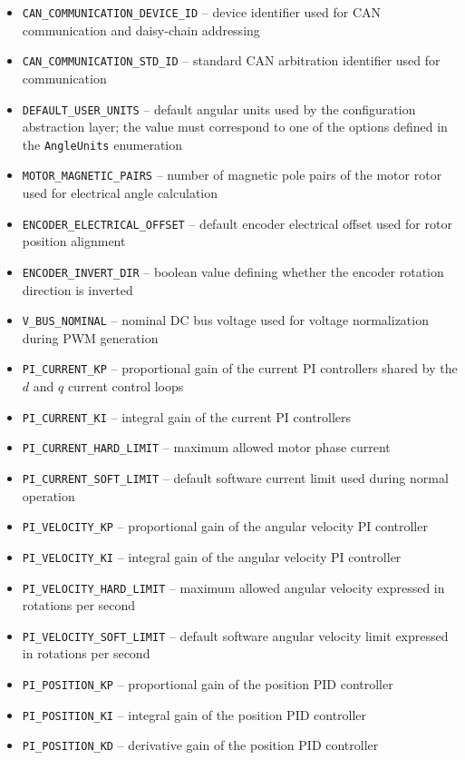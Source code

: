 \begin{itemize}
    \item \texttt{CAN\_COMMUNICATION\_DEVICE\_ID} -- device identifier used for CAN communication and daisy-chain addressing
    \item \texttt{CAN\_COMMUNICATION\_STD\_ID} -- standard CAN arbitration identifier used for communication
    \item \texttt{DEFAULT\_USER\_UNITS} -- default angular units used by the configuration abstraction layer; the value must correspond 
                                            to one of the options defined in the \texttt{AngleUnits} enumeration
    \item \texttt{MOTOR\_MAGNETIC\_PAIRS} -- number of magnetic pole pairs of the motor rotor used for electrical angle calculation
    \item \texttt{ENCODER\_ELECTRICAL\_OFFSET} -- default encoder electrical offset used for rotor position alignment
    \item \texttt{ENCODER\_INVERT\_DIR} -- boolean value defining whether the encoder rotation direction is inverted
    \item \texttt{V\_BUS\_NOMINAL} -- nominal DC bus voltage used for voltage normalization during PWM generation

    \item \texttt{PI\_CURRENT\_KP} -- proportional gain of the current PI controllers shared by the $d$ and $q$ current control loops
    \item \texttt{PI\_CURRENT\_KI} -- integral gain of the current PI controllers
    \item \texttt{PI\_CURRENT\_HARD\_LIMIT} -- maximum allowed motor phase current
    \item \texttt{PI\_CURRENT\_SOFT\_LIMIT} -- default software current limit used during normal operation

    \item \texttt{PI\_VELOCITY\_KP} -- proportional gain of the angular velocity PI controller
    \item \texttt{PI\_VELOCITY\_KI} -- integral gain of the angular velocity PI controller
    \item \texttt{PI\_VELOCITY\_HARD\_LIMIT} -- maximum allowed angular velocity expressed in rotations per second
    \item \texttt{PI\_VELOCITY\_SOFT\_LIMIT} -- default software angular velocity limit expressed in rotations per second

    \item \texttt{PI\_POSITION\_KP} -- proportional gain of the position PID controller
    \item \texttt{PI\_POSITION\_KI} -- integral gain of the position PID controller
    \item \texttt{PI\_POSITION\_KD} -- derivative gain of the position PID controller
\end{itemize}



